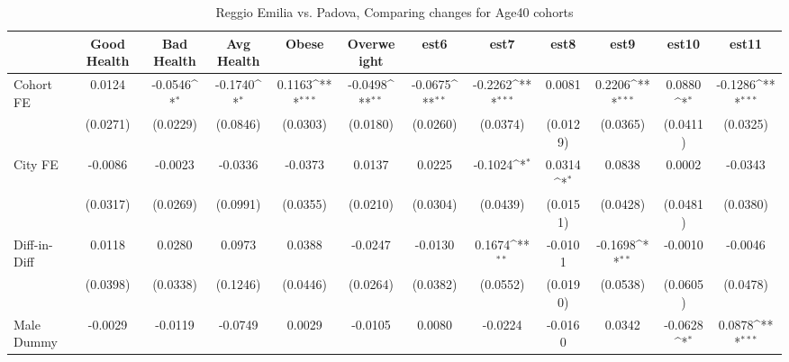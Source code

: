 \begin{table}[htbp]\centering
\def\sym#1{\ifmmode^{#1}\else\(^{#1}\)\fi}
\caption{Reggio Emilia vs. Padova, Comparing changes for Age40 cohorts}
\begin{tabular}{l*{11}{c}}
\toprule
            &\multicolumn{1}{c}{Good Health}&\multicolumn{1}{c}{Bad Health}&\multicolumn{1}{c}{Avg Health}&\multicolumn{1}{c}{Obese}&\multicolumn{1}{c}{Overweight}&\multicolumn{1}{c}{est6}&\multicolumn{1}{c}{est7}&\multicolumn{1}{c}{est8}&\multicolumn{1}{c}{est9}&\multicolumn{1}{c}{est10}&\multicolumn{1}{c}{est11}\\
\midrule
Cohort FE   &      0.0124         &     -0.0546\sym{*}  &     -0.1740\sym{*}  &      0.1163\sym{***}&     -0.0498\sym{**} &     -0.0675\sym{**} &     -0.2262\sym{***}&      0.0081         &      0.2206\sym{***}&      0.0880\sym{*}  &     -0.1286\sym{***}\\
            &    (0.0271)         &    (0.0229)         &    (0.0846)         &    (0.0303)         &    (0.0180)         &    (0.0260)         &    (0.0374)         &    (0.0129)         &    (0.0365)         &    (0.0411)         &    (0.0325)         \\
\addlinespace
City FE     &     -0.0086         &     -0.0023         &     -0.0336         &     -0.0373         &      0.0137         &      0.0225         &     -0.1024\sym{*}  &      0.0314\sym{*}  &      0.0838         &      0.0002         &     -0.0343         \\
            &    (0.0317)         &    (0.0269)         &    (0.0991)         &    (0.0355)         &    (0.0210)         &    (0.0304)         &    (0.0439)         &    (0.0151)         &    (0.0428)         &    (0.0481)         &    (0.0380)         \\
\addlinespace
Diff-in-Diff&      0.0118         &      0.0280         &      0.0973         &      0.0388         &     -0.0247         &     -0.0130         &      0.1674\sym{**} &     -0.0101         &     -0.1698\sym{**} &     -0.0010         &     -0.0046         \\
            &    (0.0398)         &    (0.0338)         &    (0.1246)         &    (0.0446)         &    (0.0264)         &    (0.0382)         &    (0.0552)         &    (0.0190)         &    (0.0538)         &    (0.0605)         &    (0.0478)         \\
\addlinespace
Male Dummy  &     -0.0029         &     -0.0119         &     -0.0749         &      0.0029         &     -0.0105         &      0.0080         &     -0.0224         &     -0.0160         &      0.0342         &     -0.0628\sym{*}  &      0.0878\sym{***}\\

\end{tabular}
\end{table}
